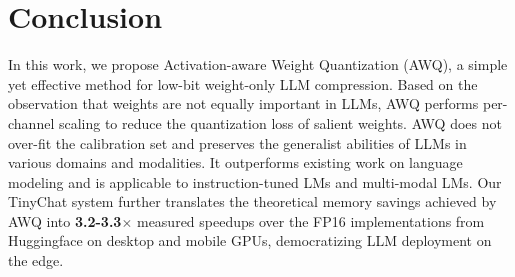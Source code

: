 \section{Conclusion}
In this work, we propose Activation-aware Weight Quantization (AWQ), a simple yet effective method for low-bit weight-only LLM compression. Based on the observation that weights are not equally important in LLMs, AWQ performs per-channel scaling to reduce the quantization loss of salient weights. AWQ does not over-fit the calibration set and preserves the generalist abilities of LLMs in various domains and modalities. It outperforms existing work on language modeling and is applicable to instruction-tuned LMs and multi-modal LMs. Our TinyChat system further translates the theoretical memory savings achieved by AWQ into \textbf{3.2-3.3$\times$} measured speedups over the FP16 implementations from Huggingface on desktop and mobile GPUs, democratizing LLM deployment on the edge.


